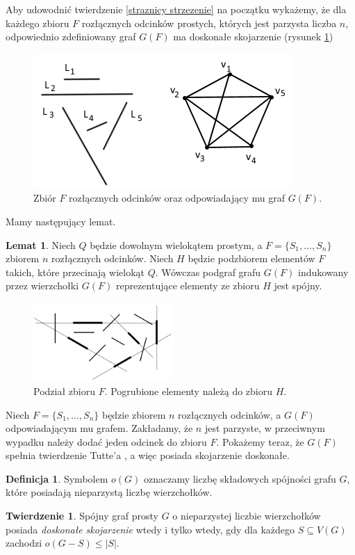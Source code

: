 \documentclass[brudnopis]{xmgr}
\theoremstyle{definition}
\newtheorem{Twierdzenie}{Twierdzenie}
\newtheorem{Lemat}{Lemat}
\newtheorem{Definicja}{Definicja}
\begin{document}
Aby udowodnić twierdzenie \ref{straznicy strzezenie} na początku wykażemy, że dla każdego zbioru $F$ rozłącznych odcinków prostych, których jest parzysta liczba $n$, odpowiednio zdefiniowany graf $G(F)$ ma doskonałe skojarzenie (rysunek \ref{fig:zbior odcinkow rozlacznych})

\begin{figure}[ht!]
 \centering
  \includegraphics{rysunki/g_f.png}
  \caption{Zbiór $F$ rozłącznych odcinków oraz odpowiadający mu graf $G(F)$.}
  \label{fig:zbior odcinkow rozlacznych}
\end{figure} 

Mamy następujący lemat.
\begin{Lemat}\label{podgraf indukowany} \cite{illumination}
Niech $Q$ będzie dowolnym wielokątem prostym, a $F = \{S_1,\ldots,S_n\}$ zbiorem $n$ rozłącznych odcinków. Niech $H$ będzie podzbiorem elementów $F$ takich, które przecinają wielokąt $Q$. Wówczas podgraf grafu $G(F)$ indukowany przez wierzchołki $G(F)$ reprezentujące elementy ze zbioru $H$ jest spójny.
\end{Lemat}
\begin{figure}[ht!]
 \centering
  \includegraphics[height=3cm]{rysunki/podzial_h.png}
  \caption{Podział zbioru $F$. Pogrubione elementy należą do zbioru $H$.}
\end{figure} 
Niech $F = \{S_1,\ldots,S_n\}$ będzie zbiorem $n$ rozłącznych odcinków, a $G(F)$ odpowiadającym mu grafem. Zakładamy, że $n$ jest parzyste, w przeciwnym wypadku należy dodać jeden odcinek do zbioru $F$. Pokażemy teraz, że $G(F)$ spełnia twierdzenie Tutte'a \cite{tutte}, a więc posiada skojarzenie doskonałe.
\begin{Definicja}
	Symbolem $o(G)$ oznaczamy liczbę składowych spójności grafu $G$, które posiadają nieparzystą liczbę wierzchołków.
\end{Definicja}
\begin{Twierdzenie} \cite{tutte}
	Spójny graf prosty $G$ o nieparzystej liczbie wierzchołków posiada \emph{doskonałe skojarzenie} wtedy i tylko wtedy, gdy dla każdego $S \subseteq V(G)$ zachodzi $o(G-S) \le |S|$.
\end{Twierdzenie}
\end{document}
